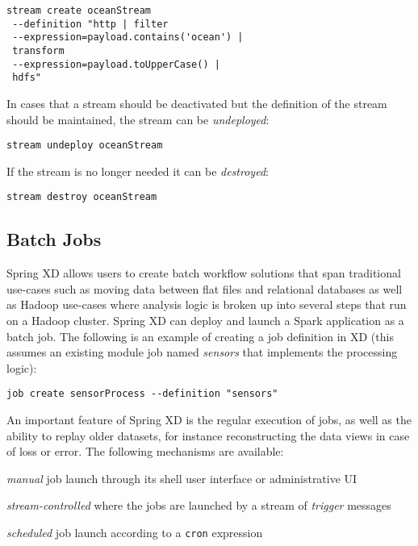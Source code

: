 \begin{lstlisting}
stream create oceanStream
 --definition "http | filter
 --expression=payload.contains('ocean') |
 transform
 --expression=payload.toUpperCase() |
 hdfs"
\end{lstlisting}

In cases that a stream should be deactivated but the definition of the stream
should be maintained, the stream can be \emph{undeployed}:

\begin{lstlisting}
stream undeploy oceanStream
\end{lstlisting}

If the stream is no longer needed it can be \emph{destroyed}:

\begin{lstlisting}
stream destroy oceanStream
\end{lstlisting}

\subsection {Batch Jobs}

Spring XD allows users to create batch workflow solutions that span traditional
use-cases such as moving data between flat files and relational databases as
well as Hadoop use-cases where analysis logic is broken up into several steps
that run on a Hadoop cluster. Spring XD can deploy and launch a Spark application
as a batch job. The following is an example of creating a
job definition in XD (this assumes an existing module job named \emph{sensors} that
implements the processing logic):

\begin{lstlisting}
job create sensorProcess --definition "sensors"
\end{lstlisting}

An important feature of Spring XD is the regular
execution of jobs, as well as the ability to replay older datasets, for
instance reconstructing the data views in case of loss or error.
The following mechanisms are available:

\begin{itemize*}
\item \emph{manual} job launch through its shell user interface or
administrative UI
\item \emph{stream-controlled} where the jobs are launched by a stream of
\emph{trigger} messages
\item \emph{scheduled} job launch according to a \texttt{cron} expression
\end{itemize*}

